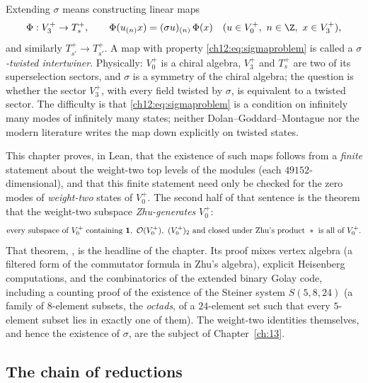 Extending $\sigma$ means constructing linear maps
\begin{equation}\label{ch12:eq:sigmaproblem}
  \Phi : V_3^+ \to T_{s}^+, \qquad \Phi(u_{(n)}x) = (\sigma u)_{(n)}\,\Phi(x)
  \quad (u\in V_0^+,\ n\in\Z,\ x\in V_3^+),
\end{equation}
and similarly $T_{s'}^+\to T_{s'}^+$.  A map with property \eqref{ch12:eq:sigmaproblem} is called a
\emph{$\sigma$-twisted intertwiner}.  Physically: $V_0^+$ is a chiral algebra, $V_3^+$ and $T_s^+$
are two of its superselection sectors, and $\sigma$ is a symmetry of the chiral algebra; the question
is whether the sector $V_3^+$, with every field twisted by $\sigma$, is equivalent to a twisted sector.
The difficulty is that \eqref{ch12:eq:sigmaproblem} is a condition on infinitely many modes of
infinitely many states; neither Dolan--Goddard--Montague nor the modern literature writes the map down
explicitly on twisted states.

This chapter proves, in Lean, that the existence of such maps follows from a \emph{finite} statement
about the weight-two top levels of the modules (each $49152$-dimensional), and that this finite
statement need only be checked for the zero modes of \emph{weight-two} states of $V_0^+$.  The second
half of that sentence is the theorem that the weight-two subspace \emph{Zhu-generates} $V_0^+$:
\begin{equation*}
  \text{every subspace of } V_0^+ \text{ containing } \mathbf 1,\ \mathcal{O}(V_0^+),\ (V_0^+)_2
  \text{ and closed under Zhu's product } \ast \text{ is all of } V_0^+ .
\end{equation*}
That theorem, , is the headline of the chapter.  Its proof
mixes vertex algebra (a filtered form of the commutator formula in Zhu's algebra), explicit
Heisenberg computations, and the combinatorics of the extended binary Golay code, including a
counting proof of the existence of the Steiner system $S(5,8,24)$ (a family of $8$-element subsets, the
\emph{octads}, of a $24$-element set such that every $5$-element subset lies in exactly one of them).  The weight-two identities
themselves, and hence the existence of $\sigma$, are the subject of Chapter~\ref{ch:13}.

\subsection*{The chain of reductions}

